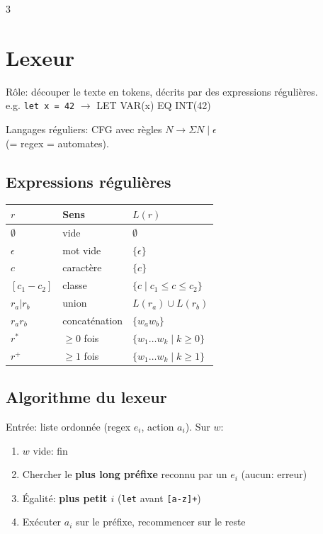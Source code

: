 \documentclass[12pt, a4paper]{article}
\begin{document}
\begin{multicols*}{3}
  \section{Lexeur}
	Rôle: découper le texte en tokens, décrits par des expressions régulières.\\
	e.g. \lstinline|let x = 42| $\rightarrow$ LET VAR(x) EQ INT(42)
 
	Langages réguliers: CFG avec règles $N\rightarrow\Sigma N\mid\epsilon$\\(= regex = automates).
 
	\subsection{Expressions régulières}
	\begin{tabular}{|l|l|l|}
		\hline
		$r$          & \textbf{Sens} & $L(r)$                                 \\
		\hline
		$\emptyset$  & vide          & $\emptyset$                            \\
		$\epsilon$   & mot vide      & $\{\epsilon\}$                         \\
		$c$          & caractère     & $\{c\}$                                \\
		$[c_1-c_2]$  & classe        & $\{c\mid c_1\leq c\leq c_2\}$          \\
		$r_a|r_b$    & union         & $L(r_a)\cup L(r_b)$                    \\
		$r_ar_b$     & concaténation & $\{w_aw_b\}$                           \\
		$r^*$        & $\geq0$ fois  & $\{w_1\ldots w_k\mid k\geq0\}$         \\
		$r^+$        & $\geq1$ fois  & $\{w_1\ldots w_k\mid k\geq1\}$         \\
		\hline
	\end{tabular}
 
	\subsection{Algorithme du lexeur}
	Entrée: liste ordonnée (regex $e_i$, action $a_i$). Sur $w$:
	\begin{enumerate}[\roman*.]
		\item $w$ vide: fin
		\item Chercher le \textbf{plus long préfixe} reconnu par un $e_i$ (aucun: erreur)
		\item Égalité: \textbf{plus petit $i$} (\lstinline|let| avant \lstinline|[a-z]+|)
		\item Exécuter $a_i$ sur le préfixe, recommencer sur le reste
	\end{enumerate}
 

\end{multicols*}
\end{document}
